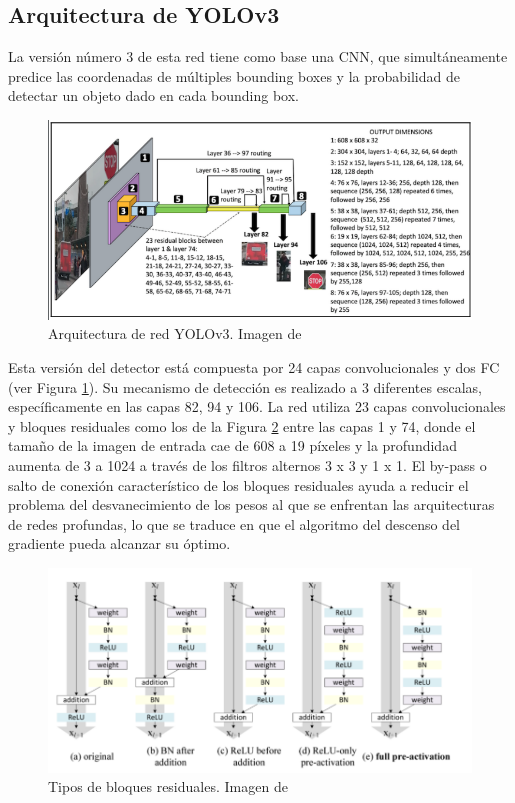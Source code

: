 \subsection{Arquitectura de YOLOv3}
La versión número 3 de esta red tiene como base una CNN, que simultáneamente predice las coordenadas de múltiples bounding boxes y la probabilidad de detectar un objeto dado en cada bounding box.
\begin{figure}[H]
    \centering
    \includegraphics[scale=0.8]{Recursos/yolov3_architecture.png}
    \caption{Arquitectura de red YOLOv3. Imagen de \cite[p.~192]{Krishnendu}}
    \label{yolov3Architecture}
\end{figure}
 Esta versión del detector está compuesta por 24 capas convolucionales y dos FC (ver Figura \ref{yolov3Architecture}). Su mecanismo de detección es realizado a 3 diferentes escalas, específicamente en las capas 82, 94 y 106. La red utiliza 23 capas convolucionales y bloques residuales como los de la Figura \ref{tipos_de_bloques_residuales} entre las capas 1 y 74, donde el tamaño de la imagen de entrada cae de 608 a 19 píxeles y la profundidad aumenta de 3 a 1024 a través de los filtros alternos 3 x 3 y 1 x 1. El by-pass o salto de conexión característico de los bloques residuales ayuda a reducir el problema del desvanecimiento de los pesos al que se enfrentan las arquitecturas de redes profundas, lo que se traduce en que el algoritmo del descenso del gradiente pueda alcanzar su óptimo.
 \begin{figure}[H]
     \centering
     \includegraphics[scale=0.6]{Recursos/residual_block.png}
     \caption{Tipos de bloques residuales. Imagen de \cite{residualBlocksPaper}}
     \label{tipos_de_bloques_residuales}
 \end{figure}
